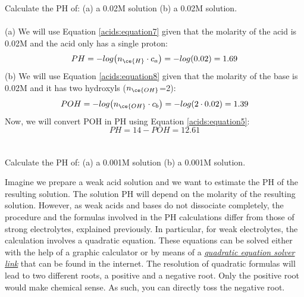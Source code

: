 \documentclass[main.tex]{subfiles}
\newcommand\chapterlabel{acids}
\begin{document}
\begin{description}
\begin{example} %
Calculate the PH of: (a) a 0.02M  solution (b) a 0.02M  solution.
\\
\\
(a) We will use Equation \ref{\chapterlabel:equation7} given that the molarity of the acid is 0.02M and the acid only has a single proton:
\[PH=-log \big(n_{\ce{H}}\cdot c_a \big)=-log (0.02)=1.69	\]
(b) We will use Equation \ref{\chapterlabel:equation8} given that the molarity of the base is 0.02M and it has two hydroxyls ($n_{\ce{OH}}$=2):
\[POH=-log \big(n_{\ce{OH}}\cdot c_b \big)=-log (2\cdot 0.02)=1.39\]
Now, we will convert POH in PH using Equation \ref{\chapterlabel:equation5}:
\[PH=14-POH=12.61\]
\\
\faDiamond\ \\
Calculate the PH of: (a) a 0.001M  solution (b) a 0.001M  solution.
\end{example}%





\item[\docfilehook{\smallpencil PH of solutions of weak acids and bases}{PH of solutions of weak acids and bases}] Imagine we prepare a weak acid solution and we want to estimate the PH of the resulting solution. The solution PH will depend on the molarity of the resulting solution. However, as weak acids and bases do not dissociate completely, the procedure and the formulas involved in the PH calculations differ from those of strong electrolytes, explained previously. In particular, for weak electrolytes, the calculation involves a quadratic equation. These equations can be solved either with the help of a graphic calculator or by means of a \faInternetExplorer \href{https://www.mathsisfun.com/quadratic-equation-solver.html}{\emph{ quadratic equation solver link}} that can be found in the internet. The resolution of quadratic formulas will lead to two different roots, a positive and a negative root. Only the positive root would make chemical sense. As such, you can directly toss the negative root.


\end{description}
\end{document}
